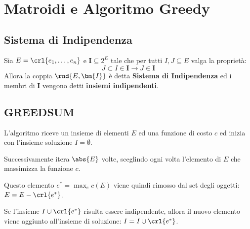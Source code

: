 \documentclass[\main/main.tex]{subfiles}
\begin{document}
\chapter{Matroidi e Algoritmo Greedy}
\section{Sistema di Indipendenza}
\begin{definition}
  Sia \(E = \crl{e_1, \ldots, e_n}\) e \(\bm{I} \subseteq 2^E\) tale che per tutti \(I, J \subseteq E\) valga la proprietà:
  \[
    J \subset I \in \bm{I} \rightarrow J \in \bm{I}
  \]
  Allora la coppia \(\rnd{E, \bm{I}}\) è detta \textbf{Sistema di Indipendenza} ed i membri di \(\bm{I}\) vengono detti \textbf{insiemi indipendenti}.
\end{definition}
\section{GREEDSUM}
L'algoritmo riceve un insieme di elementi \(E\) ed una funzione di costo \(c\) ed inizia con l'insieme soluzione \(I = \emptyset \).

Successivamente itera \(\abs{E}\) volte, sceglindo ogni volta l'elemento di \(E\) che massimizza la funzione \(c\).

Questo elemento \(e^* = \max_e c(E)\) viene quindi rimosso dal set degli oggetti: \(E = E - \crl{e^*}\).

Se l'insieme \(I \cup \crl{e^*}\) risulta essere indipendente, allora il nuovo elemento viene aggiunto all'insieme di soluzione: \(I = I \cup \crl{e^*}\).
\end{document}
